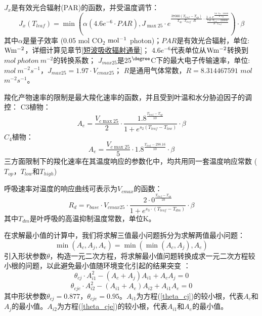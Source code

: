      
$J_x$是有效光合辐射(PAR)的函数，并受温度调节：
\begin{equation}
J_{x}\left(T_{{leaf }}\right)=\min \left(\alpha\left(4.6 e^{-6} \cdot P A R\right), J_{\max 25}
 \cdot e^{\frac{37000\left(T_{{leaf }}-T_{o p}\right)}{T_{o p} \cdot T_{{leaf }} \cdot R} \cdot \frac{1+e^{\frac{710 \cdot T_{o p}-220000}
 {R \cdot T_{o p}}}}{\frac{710 \cdot T_{{leaf }}-220000}{R \cdot T_{{leaf }}}}}\right) \cdot \beta
\end{equation}
其中$\alpha$是量子效率 (0.05 mol CO$_2$ $\rm mol^{-1}$ photon)；$PAR$是有效光合辐射，单位: $\rm W m^{-2}$，详细计算见章节\ref{短波吸收辐射通量}；
$4.6e^{-6}$代表单位从$\rm W m^{-2}$转换到$mol\ photon\ m^{-2}$的转换系数；
$J_{max25}$是25$\rm ^{\degree}$C下的最大电子传输速率，单位: $mol\ m^{-2}s^{-1}$，$J_{max25}=1.97 \cdot V_{cmax25}$； 
$R$是通用气体常数，$R=8.314467591$ $mol$ $m^{-2}s^{-1}$。


羧化产物速率的限制是最大羧化速率的函数，并且受到叶温和水分胁迫因子的调控：
C3植物：\\
\begin{equation}\label{A_e_a}
A_e=\frac{V_{c \max 25}}{2} \cdot \frac{1.8^{\frac{T_{{leaf }}-T_{o p}}{10}}}{1+e^{s_{2}\left(T_{{leaf }}-T_{{low }}\right)}} \cdot \beta
\end{equation}
$C_4$植物：\\
\begin{equation}\label{A_e_b}
A_e=\frac{V_{c \max 25}}{5} \cdot 1.8^{\frac{T_{{leaf }}-298.16}{10}} \cdot \beta
\end{equation}
三方面限制下的羧化速率在其温度响应的参数化中，均共用同一套温度响应常数 ($T_{op}$，$T_{low}$和$T_{high}$)


呼吸速率对温度的响应曲线可表示为$V_{cmax}$的函数：
\begin{equation}\label{R_d1}
R_{d}=r_{{base }} \cdot V_{cmax 25} \cdot \frac{2 \cdot 0^{\frac{T_{leaf}-T_{op}}{10}}}{1+e^{s_3 \cdot\left(T_{leaf}-T_{d m}\right)}} \cdot \beta
\end{equation}
其中$T_{dm}$是叶呼吸的高温抑制温度常数，单位K。



在求解最小值的计算中，我们将求解三值最小问题拆分为求解两值最小问题：
\begin{equation}\label{min_Ac_Aj_Ae}
\min \left(A_{c}, A_{j}, A_{e}\right)=\min \left(\min \left(A_{c}, A_{j}\right), A_{e}\right)
\end{equation}
引入形状参数$\theta$，构造一元二次方程，将求解最小值问题转换成求一元二次方程较小根的问题，以此避免最小值随环境变化引起的结果突变 \citep{collatz1991,collatz1992}：
\begin{equation}\label{theta_cj}
\theta_{c j} \cdot A_{i1}^{2}-\left(A_{c}+A_{j}\right) A_{i1}+A_{c} A_{j}=0
\end{equation}
\begin{equation}\label{theta_cje}
\theta_{c j e} \cdot A_{i2}^{2}-\left(A_{i1}+A_{e}\right) A_{i2}+A_{i1} A_{e}=0
\end{equation}
其中形状参数$\theta_{cj}=0.877$，$\theta_{cje}=0.95$。$A_{i1}$为方程(\ref{theta_cj})的较小根，代表$A_c$和$A_j$的最小值。$A_{i2}$为方程(\ref{theta_cje})的较小根，代表$A_{i1}$和$A_e$的最小值。


